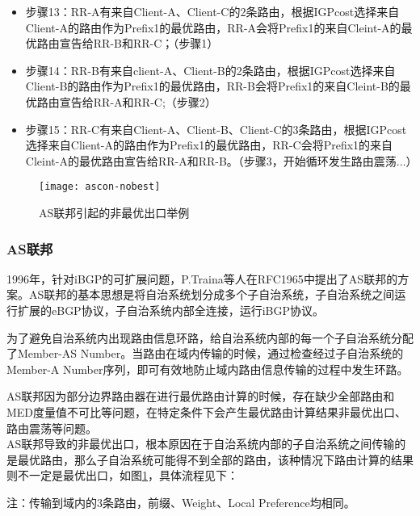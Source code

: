 \begin{itemize}
\item 步骤13：RR-A有来自Client-A、Client-C的2条路由，根据IGPcost选择来自Client-A的路由作为Prefix1的最优路由，RR-A会将Prefix1的来自Cleint-A的最优路由宣告给RR-B和RR-C；（步骤1）
\item 步骤14：RR-B有来自client-A、Client-B的2条路由，根据IGPcost选择来自Client-B的路由作为Prefix1的最优路由，RR-B会将Prefix1的来自Cleint-B的最优路由宣告给RR-A和RR-C;（步骤2）
\item 步骤15：RR-C有来自Client-A、Client-B、Client-C的3条路由，根据IGPcost选择来自Client-A的路由作为Prefix1的最优路由，RR-C会将Prefix1的来自Cleint-A的最优路由宣告给RR-A和RR-B。（步骤3，开始循环发生路由震荡...）

\end{itemize}

\begin{figure}
  \centering
  \texttt{[image: ascon-nobest]}
  \caption{AS联邦引起的非最优出口举例}
  \label{fig:ascon-nobest}
\end{figure}


\subsubsection{AS联邦\cite{rfc1965}}


1996年，针对iBGP的可扩展问题，P.Traina等人在RFC1965\cite{rfc1965}中提出了AS联邦的方案。AS联邦的基本思想是将自治系统划分成多个子自治系统，子自治系统之间运行扩展的eBGP协议，子自治系统内部全连接，运行iBGP协议。

为了避免自治系统内出现路由信息环路，给自治系统内部的每一个子自治系统分配了Member-AS Number。当路由在域内传输的时候，通过检查经过子自治系统的Member-A Number序列，即可有效地防止域内路由信息传输的过程中发生环路。






AS联邦因为部分边界路由器在进行最优路由计算的时候，存在缺少全部路由和MED度量值不可比等问题，在特定条件下会产生最优路由计算结果非最优出口、路由震荡等问题。\\



AS联邦导致的非最优出口\cite{rfc5065}，根本原因在于自治系统内部的子自治系统之间传输的是最优路由，那么子自治系统可能得不到全部的路由，该种情况下路由计算的结果则不一定是最优出口，如图\ref{fig:ascon-nobest}，具体流程见下：

注：传输到域内的3条路由，前缀、Weight、Local Preference均相同。

